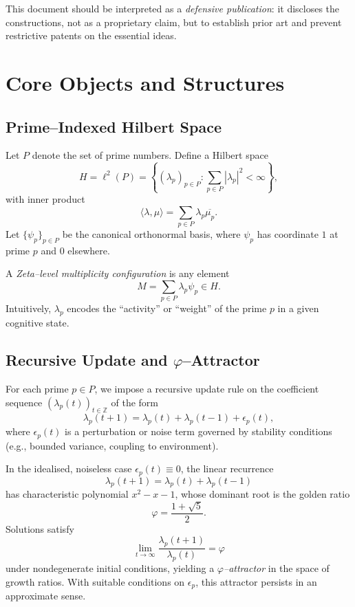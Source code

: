 \documentclass[11pt]{article}
\begin{document}
This document should be interpreted as a \emph{defensive publication}: it discloses the constructions, not as a proprietary claim, but to establish prior art and prevent restrictive patents on the essential ideas.

\section{Core Objects and Structures}

\subsection{Prime--Indexed Hilbert Space}

Let $P$ denote the set of prime numbers.
Define a Hilbert space
\[
H = \ell^2(P) = \left\{ (\lambda_p)_{p\in P} : \sum_{p\in P} |\lambda_p|^2 < \infty \right\},
\]
with inner product
\[
\langle \lambda, \mu \rangle = \sum_{p\in P} \lambda_p \overline{\mu_p}.
\]
Let $\{\psi_p\}_{p\in P}$ be the canonical orthonormal basis, where $\psi_p$ has coordinate $1$ at prime $p$ and $0$ elsewhere.

A \emph{Zeta--level multiplicity configuration} is any element
\[
M = \sum_{p\in P} \lambda_p \psi_p \in H.
\]
Intuitively, $\lambda_p$ encodes the ``activity'' or ``weight'' of the prime $p$ in a given cognitive state.

\subsection{Recursive Update and $\varphi$--Attractor}

For each prime $p\in P$, we impose a recursive update rule on the coefficient sequence $(\lambda_p(t))_{t\in\mathbb{Z}}$ of the form
\begin{equation}
  \lambda_p(t+1) = \lambda_p(t) + \lambda_p(t-1) + \epsilon_p(t),
  \label{eq:fibonacci-update}
\end{equation}
where $\epsilon_p(t)$ is a perturbation or noise term governed by stability conditions (e.g., bounded variance, coupling to environment).

In the idealised, noiseless case $\epsilon_p(t)\equiv 0$, the linear recurrence
\[
\lambda_p(t+1) = \lambda_p(t) + \lambda_p(t-1)
\]
has characteristic polynomial $x^2 - x - 1$, whose dominant root is the golden ratio
\[
\varphi = \frac{1+\sqrt{5}}{2}.
\]
Solutions satisfy
\[
\lim_{t\to\infty} \frac{\lambda_p(t+1)}{\lambda_p(t)} = \varphi
\]
under nondegenerate initial conditions, yielding a \emph{$\varphi$--attractor} in the space of growth ratios.
With suitable conditions on $\epsilon_p$, this attractor persists in an approximate sense.
\end{document}
